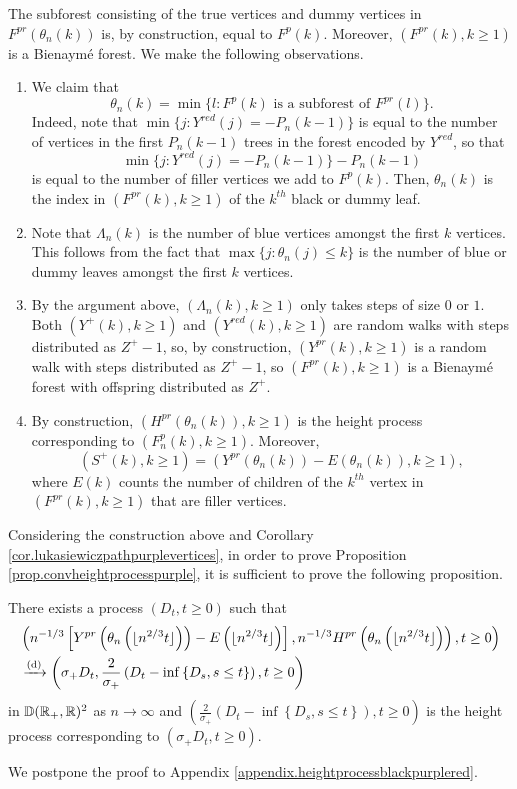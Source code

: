 The subforest consisting of the true vertices and dummy vertices in $F^{pr}(\theta_n(k))$ is, by construction, equal to $F^{p}(k)$. Moreover, $(F^{pr}(k),k\geq 1)$ is a Bienaymé forest. We make the following observations.
\begin{enumerate}
    \item We claim that $$\theta_n(k)=\min\{l: F^p(k)\text{ is a subforest of }F^{pr}(l)\}.$$ Indeed, note that $\min\{j: Y^{red}(j)=-P_n(k-1)\}$ is equal to the number of vertices in the first $P_n(k-1)$ trees in the forest encoded by $Y^{red}$, so that $$\min\{j: Y^{red}(j)=-P_n(k-1)\}-P_n(k-1)$$ is equal to the number of filler vertices we add to $F^p(k)$. Then, $\theta_n(k)$ is the index in $(F^{pr}(k),k\geq 1)$ of the $k^{th}$ black or dummy leaf. 
    \item Note that $\Lambda_n(k)$ is the number of blue vertices amongst the first $k$ vertices. This follows from the fact that $\max\{j:\theta_n(j)\leq k\}$ is the number of blue or dummy leaves amongst the first $k$ vertices. 
    \item By the argument above, $(\Lambda_n(k),k\geq 1)$ only takes steps of size $0$ or $1$. Both $(Y^+(k),k\geq 1)$ and $(Y^{red}(k),k\geq 1)$ are random walks with steps distributed as $Z^+-1$, so, by construction, $(Y^{pr}(k),k\geq 1)$ is a random walk with steps distributed as $Z^+-1$, so $(F^{pr}(k),k\geq 1)$ is a Bienaymé forest with offspring distributed as $Z^+$.
    \item By construction, $(H^{pr}(\theta_n(k)),k\geq 1)$ is the height process corresponding to $(F^p_n(k),k\geq 1)$. Moreover,
   \begin{equation}\label{eq.constructionSp}(S^{+}(k),k\geq 1)=(Y^{pr}(\theta_n(k))-E(\theta_n(k)),k\geq 1),\end{equation}
    where 
    $E(k)$ counts the number of children of the $k^{th}$ vertex in $(F^{pr}(k),k\geq 1)$ that are filler vertices.
\end{enumerate}
Considering the construction above and Corollary \ref{cor.lukasiewiczpathpurplevertices}, in order to prove Proposition \ref{prop.convheightprocesspurple}, it is sufficient to prove the following proposition.
\begin{proposition}\label{prop.heightprocessblackpurplered}
There exists a process $(D_t,t\geq 0)$ such that 
\begin{align*}
    &\left(n^{-1/3}\left[Y^{pr}\left(\theta_n\left(\lfloor n^{2/3}t\rfloor \right)\right)-E\left(\lfloor n^{2/3}t\rfloor \right)\right], n^{-1/3}H^{pr}\left(\theta_n\left(\lfloor n^{2/3}t\rfloor \right)\right),t\geq 0\right)\\
    &\xrightarrow[]{\mathrm{(d)}}\left(\sigma_+D_t,\frac{2}{\sigma_+}\left(D_t-\inf\left\{D_s,s\leq t\right\}\right),t\geq 0\right)
\end{align*}
in ${\mathbb D}({\mathbb R}_+,{\mathbb R})^2$ as $n\to \infty$ and $\left(\frac{2}{\sigma_+}\left(D_t-\inf\left\{D_s,s\leq t\right\}\right),t\geq 0\right)$ is the height process corresponding to $(\sigma_+D_t,t\geq 0)$.
\end{proposition} 
We postpone the proof to Appendix \ref{appendix.heightprocessblackpurplered}. 

